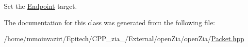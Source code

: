 Set the \mbox{\hyperlink{classo_z_1_1_endpoint}{Endpoint}} target. 



The documentation for this class was generated from the following file\+:\begin{DoxyCompactItemize}
\item 
/home/mmoinvaziri/\+Epitech/\+C\+P\+P\+\_\+zia\+\_/\+External/open\+Zia/open\+Zia/\mbox{\hyperlink{_packet_8hpp}{Packet.\+hpp}}\end{DoxyCompactItemize}
